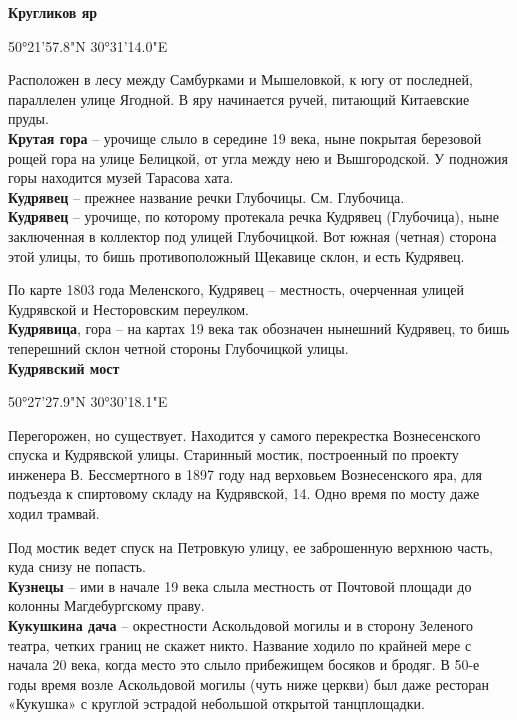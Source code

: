 \textbf{Кругликов яр} 

50°21'57.8"N 30°31'14.0"E

Расположен в лесу между Самбурками и Мышеловкой, к югу от последней, параллелен улице Ягодной. В яру начинается ручей, питающий Китаевские пруды.\\

\textbf{Крутая гора} – урочище слыло в середине 19 века, ныне покрытая березовой рощей гора на улице Белицкой, от угла между нею и Вышгородской. У подножия горы находится музей Тарасова хата.\\

\textbf{Кудрявец} – прежнее название речки Глубочицы. См. Глубочица.\\

\textbf{Кудрявец} – урочище, по которому протекала речка Кудрявец (Глубочица), ныне заключенная в коллектор под улицей Глубочицкой. Вот южная (четная) сторона этой улицы, то бишь противоположный Щекавице склон, и есть Кудрявец.

По карте 1803 года Меленского, Кудрявец – местность, очерченная улицей Кудрявской и Несторовским переулком.\\

\textbf{Кудрявица}, гора – на картах 19 века так обозначен нынешний Кудрявец, то бишь теперешний склон четной стороны Глубочицкой улицы.\\

\textbf{Кудрявский мост}

50°27'27.9"N 30°30'18.1"E

Перегорожен, но существует. Находится у самого перекрестка Вознесенского спуска и Кудрявской улицы. Старинный мостик, построенный по проекту инженера В. Бессмертного в 1897 году над верховьем Вознесенского яра, для подъезда к спиртовому складу на Кудрявской, 14. Одно время по мосту даже ходил трамвай.

Под мостик ведет спуск на Петровкую улицу, ее заброшенную верхнюю часть, куда снизу не попасть.\\


\textbf{Кузнецы} – ими в начале 19 века слыла местность от Почтовой площади до колонны Магдебургскому праву.\\

\textbf{Кукушкина дача} – окрестности Аскольдовой могилы и в сторону Зеленого театра, четких границ не скажет никто. Название ходило по крайней мере с начала 20 века, когда место это слыло прибежищем босяков и бродяг. В 50-е годы время возле Аскольдовой могилы (чуть ниже церкви) был даже ресторан «Кукушка» с круглой эстрадой небольшой открытой танцплощадки. \\

